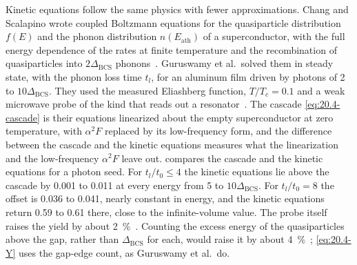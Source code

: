 Kinetic equations follow the same physics with fewer approximations. Chang and Scalapino wrote coupled Boltzmann equations for the quasiparticle distribution $f(E)$ and the phonon distribution $n(E_{\mathrm{ath}})$ of a superconductor, with the full energy dependence of the rates at finite temperature and the recombination of quasiparticles into $2\Delta_{\mathrm{BCS}}$ phonons~\cite{chang1977kinetic,chang1978nonequilibrium}. Guruswamy et al.\ solved them in steady state, with the phonon loss time $t_l$, for an aluminum film driven by photons of 2 to $10\Delta_{\mathrm{BCS}}$. They used the measured Eliashberg function, $T/T_c = 0.1$ and a weak microwave probe of the kind that reads out a resonator~\cite[Fig.~4]{guruswamy2014quasiparticle}. The cascade \cref{eq:20.4-cascade} is their equations linearized about the empty superconductor at zero temperature, with $\alpha^2F$ replaced by its low-frequency form, and the difference between the cascade and the kinetic equations measures what the linearization and the low-frequency $\alpha^2F$ leave out.  compares the cascade and the kinetic equations for a photon seed. For $t_l/t_0 \le 4$ the kinetic equations lie above the cascade by 0.001 to 0.011 at every energy from 5 to $10\Delta_{\mathrm{BCS}}$. For $t_l/t_0 = 8$ the offset is 0.036 to 0.041, nearly constant in energy, and the kinetic equations return 0.59 to 0.61 there, close to the infinite-volume value. The probe itself raises the yield by about \SI{2}{\percent}~\cite[Sect.~V]{guruswamy2014quasiparticle}. Counting the excess energy of the quasiparticles above the gap, rather than $\Delta_{\mathrm{BCS}}$ for each, would raise it by about \SI{4}{\percent}~\cite[Sect.~V]{guruswamy2014quasiparticle}; \cref{eq:20.4-Y} uses the gap-edge count, as Guruswamy et al.\ do.


